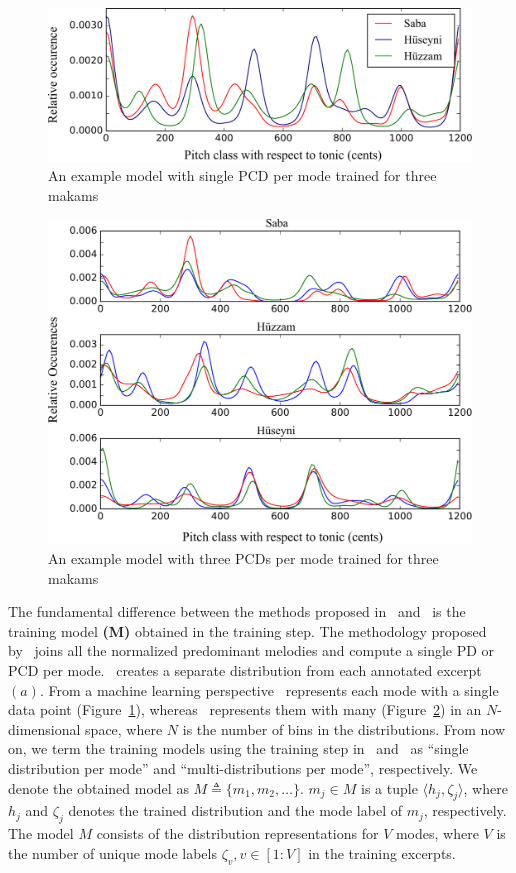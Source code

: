 \documentclass{sig-alternate}
\begin{document}
\begin{figure}
\centering
\includegraphics[width=.80\columnwidth]{figures/bozkurt_pcd}
\caption{An example model with single PCD per mode trained for three makams}
\label{fig:bozkurt_training}
\end{figure}

\begin{figure}
\centering
\includegraphics[width=.95\columnwidth]{figures/chordia_pcd}
\caption{An example model with three PCDs per mode trained for three makams}
\label{fig:chordia_training}
\end{figure}

The fundamental difference between the methods proposed in~\cite{bozkurt_makam} and~\cite{chordia} is the training model {\bf (M)} obtained in the training step. The methodology proposed by~\cite{bozkurt_makam} joins all the normalized predominant melodies and compute a single PD or PCD per mode.~\cite{chordia} creates a separate distribution from each annotated excerpt $(a)$. From a machine learning perspective~\cite{bozkurt_makam} represents each mode with a single data point (Figure~\ref{fig:bozkurt_training}), whereas~\cite{chordia} represents them with many (Figure~\ref{fig:chordia_training}) in an $N$-dimensional space, where $N$ is the number of bins in the distributions. From now on, we term the training models using the training step in~\cite{bozkurt_makam} and~\cite{chordia} as ``single distribution per mode'' and ``multi-distributions per mode'', respectively. We denote the obtained model as $M \triangleq \{m_1, m_2, \dots\}$. $m_j \in M$ is a tuple $\langle h_j, \zeta_j\rangle$, where $h_j$ and $\zeta_j$ denotes the trained distribution and the mode label of $m_j$, respectively. The model $M$ consists of the distribution representations for $V$ modes, where $V$ is the number of unique mode labels $\zeta_v, v \in [1:V]$ in the training excerpts.
\end{document}
